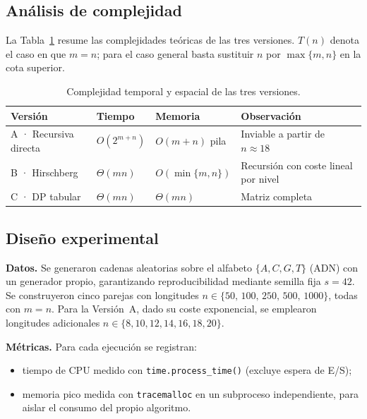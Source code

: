 \documentclass[11pt,a4paper]{article}
\begin{document}
\subsection{Análisis de complejidad}

La Tabla~\ref{tab:complejidad} resume las complejidades teóricas de las
tres versiones. $T(n)$ denota el caso en que $m=n$; para el caso general
basta sustituir $n$ por $\max\{m,n\}$ en la cota superior.

\begin{table}[h]
\centering
\begin{tabular}{@{}llll@{}}
\toprule
\textbf{Versión} & \textbf{Tiempo} & \textbf{Memoria} & \textbf{Observación}\\
\midrule
A · Recursiva directa    & $O(2^{m+n})$                  & $O(m+n)$ pila    & Inviable a partir de $n\approx 18$\\
B · Hirschberg           & $\Theta(mn)$                  & $O(\min\{m,n\})$ & Recursión con coste lineal por nivel\\
C · DP tabular           & $\Theta(mn)$                  & $\Theta(mn)$     & Matriz completa\\
\bottomrule
\end{tabular}
\caption{Complejidad temporal y espacial de las tres versiones.}\label{tab:complejidad}
\end{table}

\subsection{Diseño experimental}

\textbf{Datos.} Se generaron cadenas aleatorias sobre el alfabeto
$\{A,C,G,T\}$ (ADN) con un generador propio, garantizando
reproducibilidad mediante semilla fija $s=42$. Se construyeron cinco
parejas con longitudes $n\in\{50,\,100,\,250,\,500,\,1000\}$, todas con
$m=n$. Para la Versión~A, dado su coste exponencial, se emplearon
longitudes adicionales $n\in\{8,10,12,14,16,18,20\}$.

\textbf{Métricas.} Para cada ejecución se registran:
\begin{itemize}
    \item tiempo de CPU medido con \texttt{time.process\_time()}
          (excluye espera de E/S);
    \item memoria pico medida con \texttt{tracemalloc} en un subproceso
          independiente, para aislar el consumo del propio algoritmo.
\end{itemize}
\end{document}
